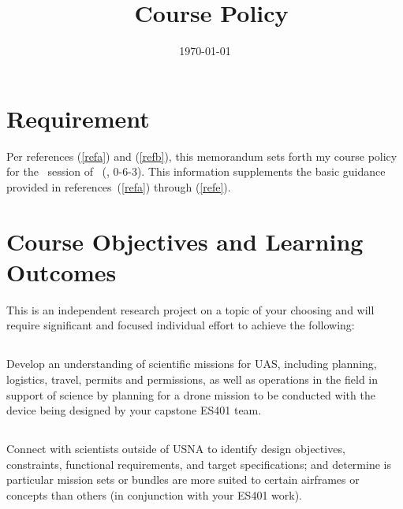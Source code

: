 \documentclass[10pt,courier]{navymemo}
\author{\usnaInstructorShort}
\title{\usnaCourseNumber\ Course Policy}
\date{\today}
\begin{document}
\makedateblock{}

\MEMORANDUM{}

\begin{navyletterheader}
\navyskip{}%

\navysubjline{}
\navyskip{}%
\end{navyletterheader}

\section{Requirement}
Per references (\ref{refa}) and (\ref{refb}), this memorandum sets forth my course policy for the \courseTerm\ session of \usnaCourseNumber\ (\usnaCourseName, 0-6-3).  This information supplements the basic guidance provided in references~(\ref{refa}) through (\ref{refe}). 

\section{Course Objectives and Learning Outcomes}  This is an independent research project on a topic of your choosing and will require significant and focused individual effort to achieve the following:
\subsection{} Develop an understanding of scientific missions for UAS, including planning, logistics, travel, permits and permissions, as well as operations in the field in support of science by planning for a drone mission to be conducted with the device being designed by your capstone ES401 team. 
\subsection{} Connect with scientists outside of USNA to identify design objectives, constraints, functional requirements, and target specifications; and determine is particular mission sets or bundles are more suited to certain airframes or concepts than others (in conjunction with your ES401 work). 
\end{document}
